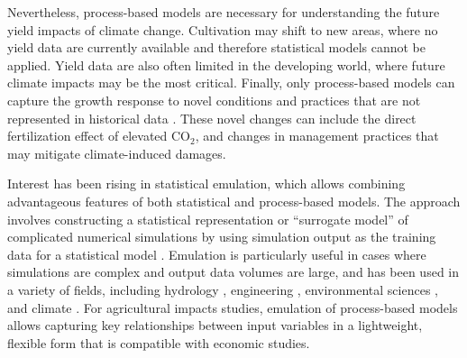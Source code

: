 \documentclass[esd, manuscript]{copernicus} %
\begin{document}
Nevertheless, process-based models are necessary for understanding the future yield impacts of climate change. Cultivation may shift to new areas, where no yield data are currently available and therefore statistical models cannot be applied. Yield data are also often limited in the developing world, where future climate impacts may be the most critical. Finally, only process-based models can capture the growth response to novel conditions and practices that are not represented in historical data \citep[e.g.][]{pugh_climate_2016, Roberts2017}. These novel changes can include the direct fertilization effect of elevated CO$_2$, and changes in management practices that may mitigate climate-induced damages.

Interest has been rising in statistical emulation, which allows combining advantageous features of both statistical and process-based models. The approach involves constructing a statistical representation or ``surrogate model'' of complicated numerical simulations by using simulation output as the training data for a statistical model \citep[e.g.][]{OHAGAN2006, OHAGAN2010}. Emulation is particularly useful in cases where simulations are complex and output data volumes are large,  and  has been used in a variety of fields, including hydrology \citep[e.g.][]{Razavi2012}, engineering \citep[e.g.][]{STORLIE2009}, environmental sciences \citep[e.g.][]{RATTO2012}, and climate \citep[e.g.][]{Castruccio14, Holden2014}. For agricultural impacts studies, emulation of process-based models allows capturing key relationships between input variables in a lightweight, flexible form that is compatible with economic studies. 

\end{document}

